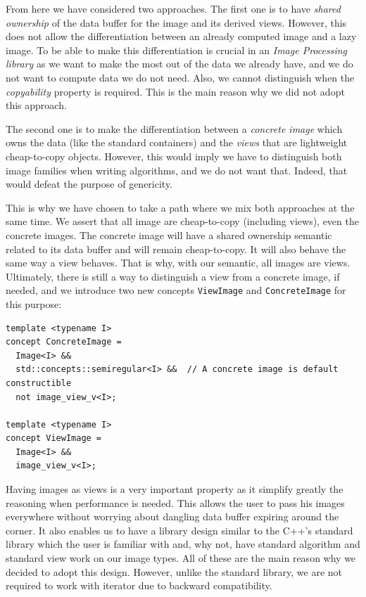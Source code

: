 From here we have considered two approaches. The first one is to have \emph{shared ownership} of the data buffer for the
image and its derived views. However, this does not allow the differentiation between an already computed image and a
lazy image. To be able to make this differentiation is crucial in an \emph{Image Processing library} as we want to make
the most out of the data we already have, and we do not want to compute data we do not need. Also, we cannot distinguish
when the \emph{copyability} property is required. This is the main reason why we did not adopt this approach.

The second one is to make the differentiation between a \emph{concrete image} which owns the data (like the standard
containers) and the \emph{views} that are lightweight cheap-to-copy objects. However, this would imply we have to
distinguish both image families when writing algorithms, and we do not want that. Indeed, that would defeat the purpose
of genericity.

This is why we have chosen to take a path where we mix both approaches at the same time. We assert that all image are
cheap-to-copy (including views), even the concrete images. The concrete image will have a shared ownership semantic
related to its data buffer and will remain cheap-to-copy. It will also behave the same way a view behaves. That is why,
with our semantic, all images are views. Ultimately, there is still a way to distinguish a view from a concrete image,
if needed, and we introduce two new concepts \texttt{ViewImage} and \texttt{ConcreteImage} for this purpose:
\begin{verbatim}
template <typename I>
concept ConcreteImage =
  Image<I> &&
  std::concepts::semiregular<I> &&  // A concrete image is default constructible
  not image_view_v<I>;

template <typename I>
concept ViewImage =
  Image<I> &&
  image_view_v<I>;
\end{verbatim}
Having images as views is a very important property as it simplify greatly the reasoning when performance is needed.
This allows the user to pass his images everywhere without worrying about dangling data buffer expiring around the
corner. It also enables us to have a library design similar to the C++'s standard library which the user is familiar
with and, why not, have standard algorithm and standard view work on our image types. All of these are the main reason
why we decided to adopt this design. However, unlike the standard library, we are not required to work with iterator due
to backward compatibility.

